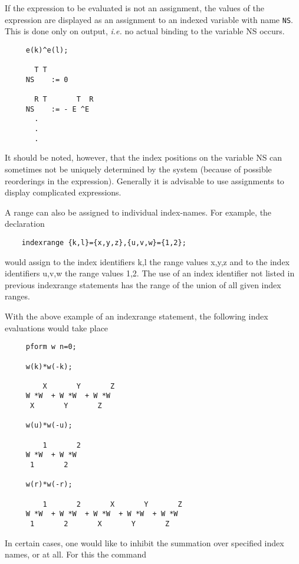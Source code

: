 If the expression to be evaluated is not an assignment, the values of
the expression are displayed as an assignment to an indexed variable
with name {\tt NS}.  This is done only on output, {\em i.e.} no actual
binding to the variable NS occurs.

\begin{verbatim}
     e(k)^e(l);

       T T
     NS    := 0

       R T       T  R
     NS    := - E ^E
       .
       .
       .
\end{verbatim}

It should be noted, however, that the index positions on the variable
NS can sometimes not be uniquely determined by the system (because of
possible reorderings in the expression). Generally it is advisable to
use assignments to display complicated expressions.

A range can also be assigned to individual index-names. For example,
the declaration

\begin{verbatim}
    indexrange {k,l}={x,y,z},{u,v,w}={1,2};
\end{verbatim}

would assign to the index identifiers k,l the range values x,y,z and
to the index identifiers u,v,w the range values 1,2. The use of an
index identifier not listed in previous indexrange statements has the
range of the union of all given index ranges.

With the above example of an indexrange statement, the following
index evaluations would take place

\begin{verbatim}
     pform w n=0;

     w(k)*w(-k);

         X       Y       Z
     W *W  + W *W  + W *W
      X       Y       Z

     w(u)*w(-u);

         1       2
     W *W  + W *W
      1       2

     w(r)*w(-r);

         1       2       X       Y       Z
     W *W  + W *W  + W *W  + W *W  + W *W
      1       2       X       Y       Z
\end{verbatim}

In certain cases, one would like to inhibit the summation over
specified index names, or at all.  For this the command

